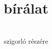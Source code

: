 \documentclass[a4paper,12pt]{article}
\title{\Dolgozattipus{} bírálat}
\author{\jelolt \\szigorló \kepzes{} részére}
\date{}
\begin{document}
\maketitle









\alairas
\end{document}
